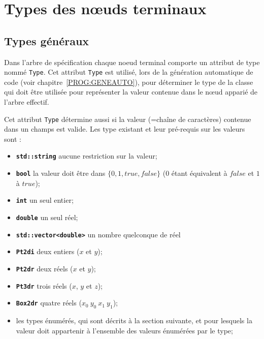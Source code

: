 
\section{Types des n\oe{}uds terminaux}

\subsection{Types g\'en\'eraux}

Dans l'arbre de sp\'ecification chaque noeud terminal comporte un attribut
de type nomm\'e {\tt Type}. Cet attribut {\tt Type} est utilis\'e, lors de la g\'en\'eration
automatique de code (voir chapitre~\ref{PROG:GENEAUTO}), pour
d\'eterminer le type de la classe  \CPP qui doit \^etre utilis\'ee
pour repr\'esenter la valeur contenue dans le n\oe{}ud appari\'e de 
l'arbre effectif.


Cet attribut {\tt Type}   d\'etermine aussi si la valeur (=cha\^ine de 
caract\`eres) contenue dans un champs est valide. Les type existant et
leur pr\'e-requis sur les valeurs sont :


\begin{itemize}
   \item {\bf \tt std::string} aucune restriction sur la valeur;
   \item {\bf \tt bool} la valeur doit \^etre dans $\{0,1,true,false\}$
         ($0$ \'etant \'equivalent \`a $false$ et $1$ \`a $true$);
   \item {\bf \tt int} un seul entier;
   \item {\bf \tt double} un seul r\'eel;
   \item {\bf \tt std::vector<double>} un nombre quelconque de r\'eel
   \item {\bf \tt Pt2di} deux entiers ($x$ et $y$);
   \item {\bf \tt Pt2dr}  deux r\'eels ($x$ et $y$);
   \item {\bf \tt Pt3dr}  trois r\'eels ($x$, $y$ et $z$);
   \item {\bf \tt Box2dr} quatre r\'eels ($x_0 \ y_0\ x_1\ y_1$);
   \item les types \'enum\'er\'es, qui sont d\'ecrits \`a la section
         suivante, et pour lesquels la valeur doit appartenir \`a 
         l'ensemble des valeurs \'enum\'er\'ees par le type;
\end{itemize}

